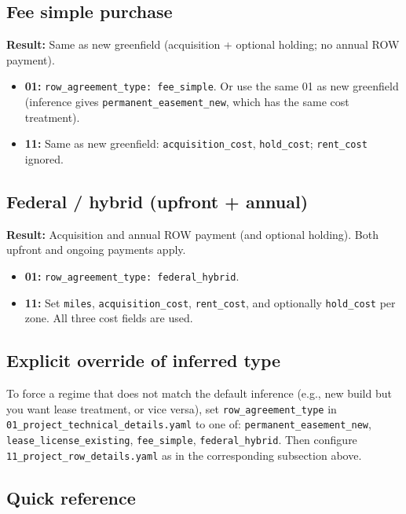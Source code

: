 \documentclass[ctcc_full_documentation.tex]{subfiles}
\begin{document}
\subsection{Fee simple purchase}

\textbf{Result:} Same as new greenfield (acquisition + optional holding; no annual ROW payment).

\begin{itemize}
    \item \textbf{01:} \texttt{row\_agreement\_type: fee\_simple}. Or use the same 01 as new greenfield (inference gives \texttt{permanent\_easement\_new}, which has the same cost treatment).
    \item \textbf{11:} Same as new greenfield: \texttt{acquisition\_cost}, \texttt{hold\_cost}; \texttt{rent\_cost} ignored.
\end{itemize}

\subsection{Federal / hybrid (upfront + annual)}

\textbf{Result:} Acquisition and annual ROW payment (and optional holding). Both upfront and ongoing payments apply.

\begin{itemize}
    \item \textbf{01:} \texttt{row\_agreement\_type: federal\_hybrid}.
    \item \textbf{11:} Set \texttt{miles}, \texttt{acquisition\_cost}, \texttt{rent\_cost}, and optionally \texttt{hold\_cost} per zone. All three cost fields are used.
\end{itemize}

\subsection{Explicit override of inferred type}

To force a regime that does not match the default inference (e.g., new build but you want lease treatment, or vice versa), set \texttt{row\_agreement\_type} in \texttt{01\_project\_technical\_details.yaml} to one of: \texttt{permanent\_easement\_new}, \texttt{lease\_license\_existing}, \texttt{fee\_simple}, \texttt{federal\_hybrid}. Then configure \texttt{11\_project\_row\_details.yaml} as in the corresponding subsection above.

\subsection{Quick reference}
\end{document}

